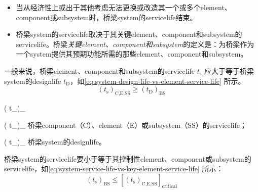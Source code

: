 \begin{itemize}
  \item 当从经济性上或出于其他考虑无法更换或改造其一个或多个\gls*{element}、\gls*{component}或\gls*{subsystem}时，桥梁\gls*{system}的\gls*{servicelife}结束。
  \item 桥梁\gls*{system}的\gls*{servicelife}取决于其关键\gls*{element}、\gls*{component}和\gls*{subsystem}的\gls*{servicelife}。桥梁\emph{关键\gls*{element}、\gls*{component}和\gls*{subsystem}}的定义是：为桥梁作为一个\gls*{system}提供其预期功能所需的那些\gls*{element}、\gls*{component}和\gls*{subsystem}。
\end{itemize}

一般来说，桥梁\gls*{element}、\gls*{component}和\gls*{subsystem}的\gls*{servicelife} $t_\text{s}$ 应大于等于桥梁\gls*{system}的\gls*{designlife} $t_\text{D}$，如\cref{eq:system-design-life-vs-element-service-life} 所示。
\begin{equation}
  \label{eq:system-design-life-vs-element-service-life}
  \left( t_\text{s}\right)_\text{C,E,SS} \geqslant \left( t_\text{D}\right)_\text{BS}
\end{equation}
\begin{EqDesc}{\left( t_\right)_}
  \item[\left( t_\text{s}\right)_\text{C,E,SS}] 桥梁\gls*{component}（C）、\gls*{element}（E）或\gls*{subsystem}（SS）的\gls*{servicelife}；
  \item[\left( t_\text{D}\right)_\text{BS}] 桥梁\gls*{system}的\gls*{designlife}。
\end{EqDesc}

桥梁\gls*{system}的\gls*{servicelife}要小于等于其控制性\gls*{element}、\gls*{component}或\gls*{subsystem}的\gls*{servicelife}，如\cref{eq:system-service-life-vs-key-element-service-life} 所示：
\begin{equation}
  \label{eq:system-service-life-vs-key-element-service-life}
  \left( t_\text{s}\right)_\text{BS} \leqslant \left[ \left( t_\text{s}\right)_\text{C,E,SS} \right]_\text{critical}
\end{equation}


